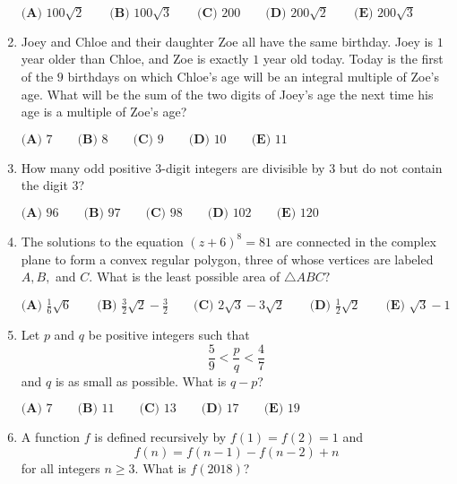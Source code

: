 \documentclass{article}
\begin{document}
\begin{enumerate}[label=\arabic*., itemsep=0.5em]
$\textbf{(A) }100\sqrt{2}\qquad\textbf{(B) }100\sqrt{3}\qquad\textbf{(C) }200\qquad\textbf{(D) }200\sqrt{2}\qquad\textbf{(E) }200\sqrt{3}$\par \vspace{0.5em}\item Joey and Chloe and their daughter Zoe all have the same birthday. Joey is $1$ year older than Chloe, and Zoe is exactly $1$ year old today. Today is the first of the $9$ birthdays on which Chloe's age will be an integral multiple of Zoe's age. What will be the sum of the two digits of Joey's age the next time his age is a multiple of Zoe's age?

$
\textbf{(A) }7 \qquad
\textbf{(B) }8 \qquad
\textbf{(C) }9 \qquad
\textbf{(D) }10 \qquad
\textbf{(E) }11 \qquad
$\par \vspace{0.5em}\item How many odd positive $3$-digit integers are divisible by $3$ but do not contain the digit $3$?

$\textbf{(A) } 96 \qquad \textbf{(B) } 97 \qquad \textbf{(C) } 98 \qquad \textbf{(D) } 102 \qquad \textbf{(E) } 120 $\par \vspace{0.5em}\item The solutions to the equation $(z+6)^8=81$ are connected in the complex plane to form a convex regular polygon, three of whose vertices are labeled $A,B,$ and $C$. What is the least possible area of $\triangle ABC?$

$\textbf{(A) } \frac{1}{6}\sqrt{6} \qquad \textbf{(B) } \frac{3}{2}\sqrt{2}-\frac{3}{2} \qquad \textbf{(C) } 2\sqrt3-3\sqrt2 \qquad \textbf{(D) } \frac{1}{2}\sqrt{2} \qquad \textbf{(E) } \sqrt 3-1$\par \vspace{0.5em}\item Let $p$ and $q$ be positive integers such that 
\begin{equation*}
\frac{5}{9} < \frac{p}{q} < \frac{4}{7}
\end{equation*}
and $q$ is as small as possible. What is $q-p$?

$\textbf{(A) } 7 \qquad \textbf{(B) } 11 \qquad \textbf{(C) } 13 \qquad \textbf{(D) } 17 \qquad \textbf{(E) } 19 $\par \vspace{0.5em}\item A function $f$ is defined recursively by $f(1)=f(2)=1$ and 
\begin{equation*}
f(n)=f(n-1)-f(n-2)+n
\end{equation*}
for all integers $n \geq 3$. What is $f(2018)$?


\end{enumerate}
\end{document}

